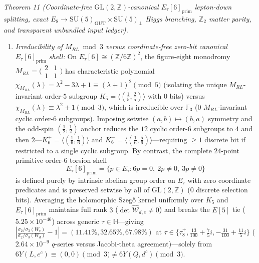 \documentclass[aps,prd,twocolumn,nofootinbib,floatfix]{revtex4-2}
\begin{document}
\emph{Theorem 11 (Coordinate-free $\mathrm{GL}(2,\mathbb{Z})$-canonical $E_\tau[6]_{\mathrm{prim}}$ lepton-down splitting, exact $E_8 \to \mathrm{SU}(5)_{\mathrm{GUT}}\times\mathrm{SU}(5)_\perp$ Higgs branching, $\mathbb{Z}_2$ matter parity, and transparent unbundled input ledger).}
\begin{enumerate}
    \item \emph{Irreducibility of $M_{RL} \bmod 3$ versus coordinate-free zero-bit canonical $E_\tau[6]_{\mathrm{prim}}$ shell:} On $E_\tau[6] \cong (\mathbb{Z}/6\mathbb{Z})^2$, the figure-eight monodromy $M_{RL} = \bigl(\begin{smallmatrix}2&1\\1&1\end{smallmatrix}\bigr)$ has characteristic polynomial $\chi_{M_{RL}}(\lambda) = \lambda^2 - 3\lambda + 1 \equiv (\lambda + 1)^2 \pmod 5$ (isolating the unique $M_{RL}$-invariant order-$5$ subgroup $K_5 = \langle(\frac{1}{5},\frac{2}{5})\rangle$ with $0$ bits) versus $\chi_{M_{RL}}(\lambda) \equiv \lambda^2 + 1 \pmod 3$, which is irreducible over $\mathbb{F}_3$ ($0$ $M_{RL}$-invariant cyclic order-$6$ subgroups). Imposing setwise $(a,b)\mapsto(b,a)$ symmetry and the odd-spin $(\frac{1}{2},\frac{1}{2})$ anchor reduces the $12$ cyclic order-$6$ subgroups to $4$ and then $2$---$K_6^+ = \langle(\frac{1}{6},\frac{1}{6})\rangle$ and $K_6^- = \langle(\frac{1}{6},\frac{5}{6})\rangle$---requiring $\ge 1$ discrete bit if restricted to a single cyclic subgroup. By contrast, the complete $24$-point primitive order-$6$ torsion shell
    \begin{equation}
    \label{eq:canonical_e6_prim}
    E_\tau[6]_{\mathrm{prim}} = \bigl\{p \in E_\tau : 6p = 0,\ 2p \ne 0,\ 3p \ne 0\bigr\}
    \end{equation}
    is defined purely by intrinsic abelian group order on $E_\tau$ with zero coordinate predicates and is preserved setwise by all of $\mathrm{GL}(2,\mathbb{Z})$ ($0$ discrete selection bits). Averaging the holomorphic Szeg\H{o} kernel uniformly over $K_5$ and $E_\tau[6]_{\mathrm{prim}}$ maintains full rank $3$ ($\det\widehat{\mathcal{W}}_{d,e} \ne 0$) and breaks the $E[5]$ tie ($5.25\times 10^{-46}$) across generic $\tau \in \mathbb{H}$---giving $|\frac{\sigma_2/\sigma_3(W_e)}{\sigma_2/\sigma_3(W_d)} - 1| = (11.41\%, 32.65\%, 67.98\%)$ at $\tau \in \{\tau_8^+, \frac{13}{100}+\frac{7}{5}i, -\frac{31}{100}+\frac{11}{5}i\}$ ($2.64\times 10^{-9}$ $q$-series versus Jacobi-theta agreement)---solely from $6Y(L,e^c) \equiv (0,0) \pmod 3 \ne 6Y(Q,d^c) \pmod 3$.

\end{enumerate}
\end{document}
